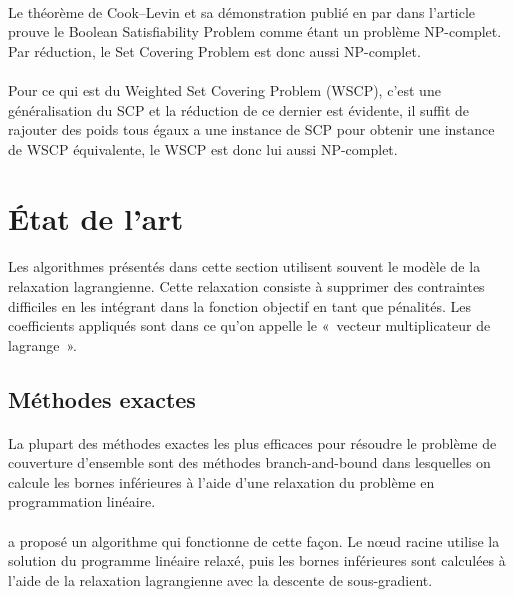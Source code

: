 \documentclass[12pt,letterpaper,twoside]{article}
\begin{document}
		\paragraph*{}
			Le théorème de Cook–Levin et sa démonstration publié en \citeyear{Cook1971} par \citeauthor{Cook1971} dans l'article \cite{Cook1971} prouve le Boolean Satisfiability Problem comme étant un problème NP-complet. Par réduction, le Set Covering Problem est donc aussi NP-complet.
		\paragraph*{}
			Pour ce qui est du Weighted Set Covering Problem (WSCP), c'est une généralisation du SCP et la réduction de ce dernier est évidente, il suffit de rajouter des poids tous égaux a une instance de SCP pour obtenir une instance de WSCP équivalente, le WSCP est donc lui aussi NP-complet.
	\section{État de l'art}
		\paragraph*{}
			Les algorithmes présentés dans cette section utilisent souvent le modèle de la relaxation lagrangienne.
			Cette relaxation consiste à supprimer des contraintes difficiles en les intégrant dans la fonction objectif en tant que pénalités.
			Les coefficients appliqués sont dans ce qu'on appelle le « vecteur multiplicateur de lagrange ».~\cite{fisher1985applications}
		\subsection{Méthodes exactes}
			\paragraph*{}
				La plupart des méthodes exactes les plus efficaces pour résoudre le problème de couverture d'ensemble sont
				des méthodes branch-and-bound
				dans lesquelles on calcule les bornes inférieures à l'aide d'une relaxation du problème en programmation
				linéaire.~\cite{caprara2000algorithms}
			\paragraph*{}
				\citeauthor{Beasley1987} a proposé un algorithme qui fonctionne de cette façon.
				Le nœud racine utilise la solution du programme linéaire relaxé, puis les bornes inférieures
				sont calculées à l'aide de la relaxation lagrangienne avec la descente de sous-gradient.~\cite{Beasley1987}
\end{document}
